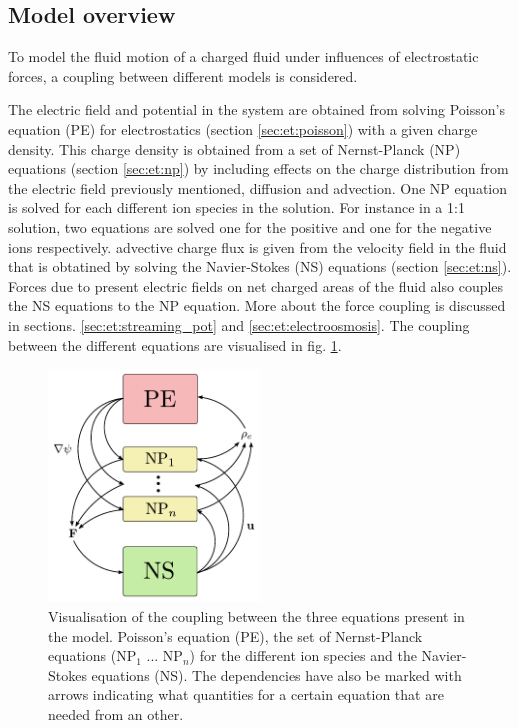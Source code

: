 \subsection{Model overview}\label{sec:et:coupling}
To model the fluid motion of a charged fluid under influences of
electrostatic forces, a coupling between different models is
considered.

The electric field and potential in the system are obtained from
solving Poisson's equation (PE) for electrostatics (section
\ref{sec:et:poisson}) with a given charge density. This charge density
is obtained from a set of Nernst-Planck (NP) equations (section
\ref{sec:et:np}) by including effects on the charge distribution from
the electric field previously mentioned, diffusion and advection. One
NP equation is solved for each different ion species in the
solution. For instance in a 1:1 solution, two equations are solved one
for the positive and one for the negative ions respectively.
advective charge flux is given from the velocity field in the fluid
that is obtatined by solving the Navier-Stokes (NS) equations (section
\ref{sec:et:ns}). Forces due to present electric fields on net charged
areas of the fluid also couples the NS equations to the NP
equation. More about the force coupling is discussed in
sections. \ref{sec:et:streaming_pot} and
\ref{sec:et:electroosmosis}. The coupling between the different
equations are visualised in fig. \ref{fig:coupling}.


\begin{figure}
\begin{center}
\includegraphics[width=0.5\textwidth]{fig/coupling.pdf}
\end{center}
\caption[Visualisation of the coupling between the equations
  present in the model.]{Visualisation of the coupling between the
  three equations present in the model. Poisson's equation (PE), the
  set of Nernst-Planck equations (NP$_1$ ... NP$_n$) for the different
  ion species and the Navier-Stokes equations (NS). The dependencies
  have also be marked with arrows indicating what quantities for a
  certain equation that are needed from an other.}
\label{fig:coupling}
\end{figure}


